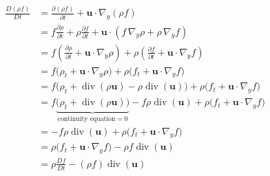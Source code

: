 \begin{equation}
\begin{aligned}
\frac{D(\rho f)}{Dt}
&= \frac{\partial (\rho f)}{\partial t} + \textbf{u}\cdot \nabla_y(\rho f)\\
&= f \frac{\partial \rho}{\partial t}
+ \rho \frac{\partial f}{\partial t}
+ \textbf{u}\cdot \left(f \, \nabla_y \rho + \rho \,\nabla_y f\right)\\
&= f \left(\frac{\partial \rho}{\partial t} + \textbf{u} \cdot \nabla_y \rho\right)
+ \rho \left(\frac{\partial f}{\partial t} + \textbf{u} \cdot \nabla_y f\right)\\
&= f \bigg(\rho_t + \textbf{u} \cdot \nabla_y \rho\bigg)
+ \rho \bigg(f_t + \textbf{u} \cdot \nabla_y f\bigg)\\
&= f \bigg(\rho_t + \operatorname{div}(\rho \textbf{u}) - \rho \operatorname{div}( \textbf{u})\bigg)
+ \rho \bigg(f_t + \textbf{u} \cdot \nabla_y f\bigg)\\
&= f \underbrace{\bigg(\rho_t + \operatorname{div}(\rho \textbf{u})\bigg)}_{\text{continuity equation}=0} - f\rho \operatorname{div}( \textbf{u})
+ \rho \bigg(f_t + \textbf{u} \cdot \nabla_y f\bigg)\\
&= - f\rho \operatorname{div}( \textbf{u})
+ \rho \bigg(f_t + \textbf{u} \cdot \nabla_y f\bigg)\\
&= \rho \bigg(f_t + \textbf{u} \cdot \nabla_y f\bigg)- \rho f \operatorname{div}( \textbf{u})\\
&= \rho \frac{Df}{Dt} -  (\rho f) \operatorname{div}( \textbf{u})\\
\end{aligned}
\end{equation}

